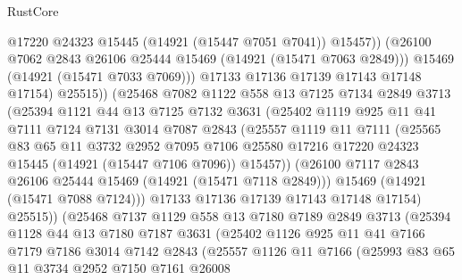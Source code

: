 \begin{lexlean}{RustCore}
\begin{coremodule}
                      @17220
                      @24323
                      @15445
                      (@14921 (@15447 @7051 @7041))
                      @15457))
                  (@26100 @7062 @2843 @26106 @25444 @15469 (@14921 (@15471 @7063 @2849)))
                  @15469
                  (@14921 (@15471 @7033 @7069)))
                @17133
                @17136
                @17139
                @17143
                @17148
                @17154)
              @25515))
          (@25468
            @7082
            @1122
            @558
            @13
            @7125
            @7134
            @2849
            @3713
            (@25394
              @1121
              @44
              @13
              @7125
              @7132
              @3631
              (@25402
                @1119
                @925
                @11
                @41
                @7111
                @7124
                @7131
                @3014
                @7087
                @2843
                (@25557
                  @1119
                  @11
                  @7111
                  (@25565
                    @83
                    @65
                    @11
                    @3732
                    @2952
                    @7095
                    @7106
                    @25580
                    @17216
                    @17220
                    @24323
                    @15445
                    (@14921 (@15447 @7106 @7096))
                    @15457))
                (@26100 @7117 @2843 @26106 @25444 @15469 (@14921 (@15471 @7118 @2849)))
                @15469
                (@14921 (@15471 @7088 @7124)))
              @17133
              @17136
              @17139
              @17143
              @17148
              @17154)
            @25515))
        (@25468
          @7137
          @1129
          @558
          @13
          @7180
          @7189
          @2849
          @3713
          (@25394
            @1128
            @44
            @13
            @7180
            @7187
            @3631
            (@25402
              @1126
              @925
              @11
              @41
              @7166
              @7179
              @7186
              @3014
              @7142
              @2843
              (@25557
                @1126
                @11
                @7166
                (@25993
                  @83
                  @65
                  @11
                  @3734
                  @2952
                  @7150
                  @7161
                  @26008

\end{coremodule}
\end{lexlean}
